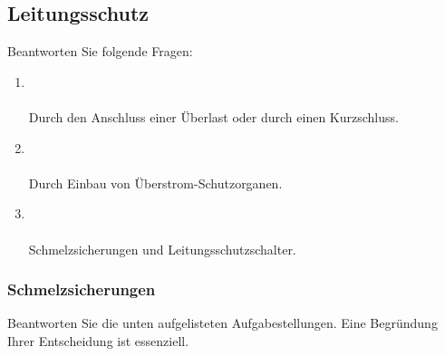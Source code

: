 \subsection{Leitungsschutz}
Beantworten Sie folgende Fragen:

\begin{enumerate}
    \item   {} \\\\
            Durch den Anschluss einer Überlast oder durch einen Kurzschluss.
    \item   {} \\\\
            Durch Einbau von Überstrom-Schutzorganen.
    \item   {} \\\\
            Schmelzsicherungen und Leitungsschutzschalter.
\end{enumerate}

\subsubsection{Schmelzsicherungen}
Beantworten Sie die unten aufgelisteten Aufgabestellungen. Eine Begründung Ihrer Entscheidung ist essenziell.

